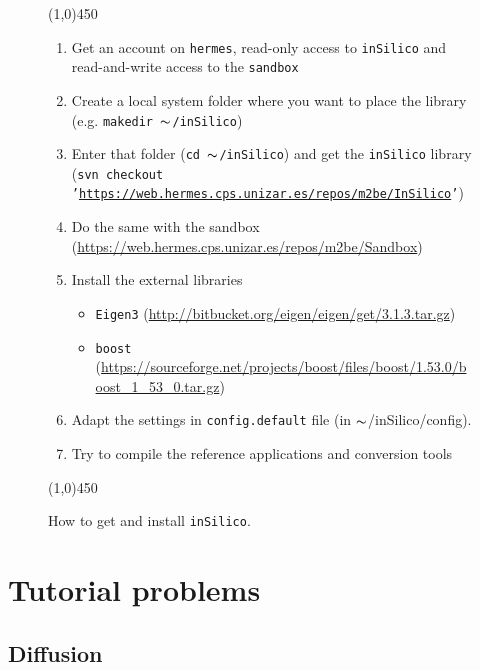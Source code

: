 \documentclass[a4paper,DIV=12,10pt]{scrartcl}
\newcommand{\IS}[0]{\texttt{inSilico}}
\newcommand{\TILDE}[0]{$\thicksim$}
\begin{document}
\begin{figure}[bthp]
  \centering
  \line(1,0){450}
  \begin{enumerate}
  \item Get an account on \texttt{hermes}, read-only access to
    \IS{} and read-and-write access to the \texttt{sandbox}
  \item Create a local system folder where you want to place the
    library (e.g. \texttt{makedir \TILDE/inSilico})
  \item Enter that folder (\texttt{cd \TILDE/inSilico}) and get the \IS{}
    library  (\texttt{svn checkout
      '\url{https://web.hermes.cps.unizar.es/repos/m2be/InSilico}'})
  \item Do the same with the sandbox
    (\url{https://web.hermes.cps.unizar.es/repos/m2be/Sandbox}) 
  \item Install the external libraries
    \begin{itemize}
    \item \texttt{Eigen3} (\url{http://bitbucket.org/eigen/eigen/get/3.1.3.tar.gz})
    \item \texttt{boost}
      (\url{https://sourceforge.net/projects/boost/files/boost/1.53.0/boost_1_53_0.tar.gz})
    \end{itemize}
  \item Adapt the settings in \texttt{config.default} file (in \TILDE/inSilico/config).
  \item Try to compile the reference applications and conversion tools
  \end{enumerate}
  \line(1,0){450}
  \caption{How to get and install \IS{}.}
  \label{fig:getinstall}
\end{figure}

\newpage
\section{Tutorial problems}

\subsection{Diffusion}
\label{sec:diffusion}
\end{document}
